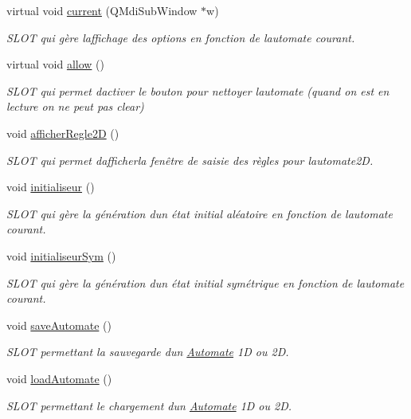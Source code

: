 \begin{DoxyCompactItemize}
virtual void \hyperlink{class_main_window_a83229b428a4774bf75bebfb6a1ae2bfe}{current} (Q\+Mdi\+Sub\+Window $\ast$w)
\begin{DoxyCompactList}\small\item\em S\+L\+OT qui gère l\textquotesingle{}affichage des options en fonction de l\textquotesingle{}automate courant. \end{DoxyCompactList}\item 
virtual void \hyperlink{class_main_window_a9a12b2903cb870b374af5f0ab8df7bda}{allow} ()
\begin{DoxyCompactList}\small\item\em S\+L\+OT qui permet d\textquotesingle{}activer le bouton pour nettoyer l\textquotesingle{}automate (quand on est en lecture on ne peut pas clear) \end{DoxyCompactList}\item 
void \hyperlink{class_main_window_ab14d52a2b2a63b6ed930e4131322dd3d}{afficher\+Regle2D} ()
\begin{DoxyCompactList}\small\item\em S\+L\+OT qui permet d\textquotesingle{}afficherla fenêtre de saisie des règles pour l\textquotesingle{}automate2D. \end{DoxyCompactList}\item 
void \hyperlink{class_main_window_a2ee1589220ee377441d94777ccef6c9f}{initialiseur} ()
\begin{DoxyCompactList}\small\item\em S\+L\+OT qui gère la génération d\textquotesingle{}un état initial aléatoire en fonction de l\textquotesingle{}automate courant. \end{DoxyCompactList}\item 
void \hyperlink{class_main_window_a611ef20ef8820089fe62ea686f321456}{initialiseur\+Sym} ()
\begin{DoxyCompactList}\small\item\em S\+L\+OT qui gère la génération d\textquotesingle{}un état initial symétrique en fonction de l\textquotesingle{}automate courant. \end{DoxyCompactList}\item 
void \hyperlink{class_main_window_a4106cf25ea9980d703e04bac7c9ecd31}{save\+Automate} ()
\begin{DoxyCompactList}\small\item\em S\+L\+OT permettant la sauvegarde d\textquotesingle{}un \hyperlink{class_automate}{Automate} 1D ou 2D. \end{DoxyCompactList}\item 
void \hyperlink{class_main_window_ad9bd4644e729ca73c06d51378aa05753}{load\+Automate} ()
\begin{DoxyCompactList}\small\item\em S\+L\+OT permettant le chargement d\textquotesingle{}un \hyperlink{class_automate}{Automate} 1D ou 2D. \end{DoxyCompactList}\end{DoxyCompactItemize}
